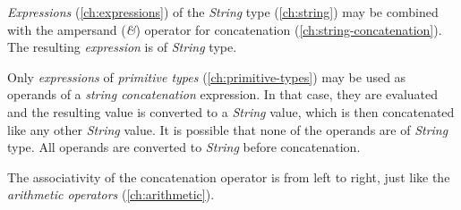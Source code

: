 \emph{Expressions} (\ref{ch:expressions}) of the \emph{String} type (\ref{ch:string})
may be combined with the ampersand (\emph{\&}) operator
for concatenation (\ref{ch:string-concatenation}).
The resulting \emph{expression} is of \emph{String} type.

Only \emph{expressions} of \emph{primitive types} (\ref{ch:primitive-types})
may be used as operands of a \emph{string concatenation} expression.
In that case,
they are evaluated and the resulting value is converted to a \emph{String} value,
which is then concatenated like any other \emph{String} value.
It is possible that none of the operands are of \emph{String} type.
All operands are converted to \emph{String} before concatenation.

The associativity of the concatenation operator is from left to right,
just like the \emph{arithmetic operators} (\ref{ch:arithmetic}).
